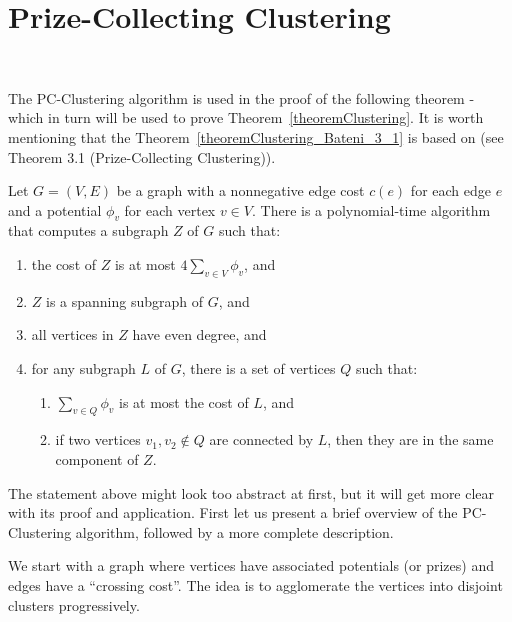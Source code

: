 \section{Prize-Collecting Clustering}~\label{section:pc_clustering}

The PC-Clustering algorithm is used in the proof of the following theorem - which in turn will be used to prove Theorem~\ref{theoremClustering}. 
It is worth mentioning that the Theorem~\ref{theoremClustering_Bateni_3_1} is based on \cite{Bateni} (see Theorem 3.1 (Prize-Collecting Clustering)).

\begin{ftheo} \label{theoremClustering_Bateni_3_1}
Let \(G=(V, E)\) be a graph with a nonnegative edge cost \(c(e)\) for each edge \(e\) and a potential \(\phi_v\) for each vertex \(v \in V\). 
There is a polynomial-time algorithm that computes a subgraph \(Z\) of \(G\) such that:

\begin{enumerate}
    \item the cost of \(Z\) is at most \(4 \sum \limits_{v \in V} \phi_v\), and~\label{condition:1}
    \item \(Z\) is a spanning subgraph of \(G\), and~\label{condition:2}
    \item all vertices in \(Z\) have even degree, and~\label{condition:3}
    \item for any subgraph \(L\) of \(G\), there is a set  of vertices \(Q\) such that: \label{condition:4}
    \begin{enumerate}
        \item \(\sum \limits_{v \in Q} \phi_v\) is at most the cost of \(L\), and \label{condition:4a}
        \item if two vertices \(v_1, v_2 \notin Q\) are connected by \(L\), then they are  in the same component of \(Z\).~\label{condition:4b}
    \end{enumerate}
\end{enumerate}
\end{ftheo}

The statement above might look too abstract at first, but it will get more clear with its proof and application. First let us present a brief overview of the PC-Clustering algorithm, followed by a more complete description.

We start with a graph where vertices have associated potentials (or prizes) and edges have a ``crossing cost''. The idea is to agglomerate the vertices into disjoint clusters progressively. 

